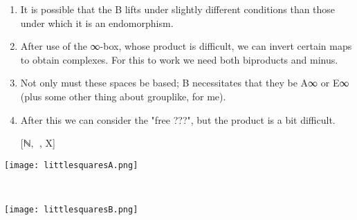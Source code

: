 \documentclass{book}
\theoremstyle{definition}
\begin{document}
\iffalse
\begin{tikzcd}
{[Cop,infinitySUB(infinity-Cat)]} \arrow[d, "(χ${}_{\cdot}$).obj C", bend left] \arrow[rrr, "(e⃗.hom F)ॱ", bend left] &  &  & {[Dop,infinitySUB(infinity-Cat)]} \arrow[lll, "(e⃗.hom F)ॱ"] \arrow[d, "(χ${}_{\cdot}$).obj D", bend left]               \\
infinitySUB(infinity-Cat)⁄C \arrow[u, "(χ${}^{\cdot}$).obj C", bend left] \arrow[rrr, "\texttt{(ω⃗.hom F)}ॱ"]                   &  &  & infinitySUB(infinity-Cat)⁄D \arrow[lll, "(ω⃗.hom F)𛲔", bend left] \arrow[u, "(χ${}^{\cdot}$).obj D", bend left]
\end{tikzcd}

\fi

\begin{enumerate}
\item It is possible that the B lifts under slightly different conditions than those under which it is an endomorphism.
\item After use of the ∞-box, whose product is difficult, we can invert certain maps to obtain complexes. For this to work we need both biproducts and minus.
\item Not only must these spaces be based; B necessitates that they be A∞ or E∞ (plus some other thing about grouplike, for me).
\item After this we can consider the "free ???", but the product is a bit difficult.
\item [[ℕ,γ⃗], X]
\end{enumerate}


\begin{center}
\texttt{[image: littlesquaresA.png]}
\end{center}
\ \\
\begin{center}
\texttt{[image: littlesquaresB.png]}
\end{center}


\iffalse
Iteration of the six operadic structures n times will give one of six versions of the little n-cubes operad ("operoid")
\fi
\end{document}
